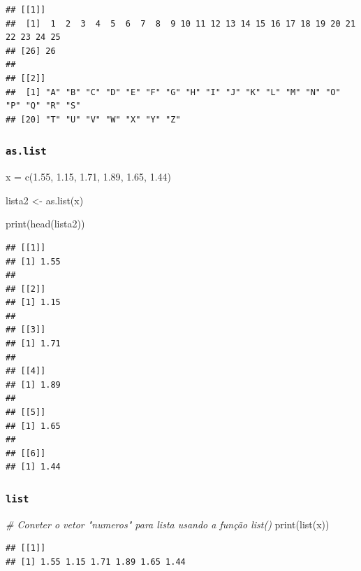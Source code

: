 \documentclass[
]{article}
\newenvironment{Shaded}{\begin{snugshade}}{\end{snugshade}}
\newcommand{\CommentTok}[1]{\textcolor[rgb]{0.56,0.35,0.01}{\textit{#1}}}
\newcommand{\FloatTok}[1]{\textcolor[rgb]{0.00,0.00,0.81}{#1}}
\newcommand{\FunctionTok}[1]{\textcolor[rgb]{0.00,0.00,0.00}{#1}}
\newcommand{\NormalTok}[1]{#1}
\newcommand{\OtherTok}[1]{\textcolor[rgb]{0.56,0.35,0.01}{#1}}
\begin{document}
\begin{verbatim}
## [[1]]
##  [1]  1  2  3  4  5  6  7  8  9 10 11 12 13 14 15 16 17 18 19 20 21 22 23 24 25
## [26] 26
## 
## [[2]]
##  [1] "A" "B" "C" "D" "E" "F" "G" "H" "I" "J" "K" "L" "M" "N" "O" "P" "Q" "R" "S"
## [20] "T" "U" "V" "W" "X" "Y" "Z"
\end{verbatim}

\hypertarget{as.list}{%
\subsubsection{\texorpdfstring{\texttt{as.list}}{as.list}}\label{as.list}}

\begin{Shaded}
\begin{Highlighting}[]
\NormalTok{x }\OtherTok{=} \FunctionTok{c}\NormalTok{(}\FloatTok{1.55}\NormalTok{, }\FloatTok{1.15}\NormalTok{, }\FloatTok{1.71}\NormalTok{, }\FloatTok{1.89}\NormalTok{, }\FloatTok{1.65}\NormalTok{, }\FloatTok{1.44}\NormalTok{)}

\NormalTok{lista2 }\OtherTok{\textless{}{-}} \FunctionTok{as.list}\NormalTok{(x)}

\FunctionTok{print}\NormalTok{(}\FunctionTok{head}\NormalTok{(lista2))}
\end{Highlighting}
\end{Shaded}

\begin{verbatim}
## [[1]]
## [1] 1.55
## 
## [[2]]
## [1] 1.15
## 
## [[3]]
## [1] 1.71
## 
## [[4]]
## [1] 1.89
## 
## [[5]]
## [1] 1.65
## 
## [[6]]
## [1] 1.44
\end{verbatim}

\hypertarget{list}{%
\subsubsection{\texorpdfstring{\texttt{list}}{list}}\label{list}}

\begin{Shaded}
\begin{Highlighting}[]
\CommentTok{\# Convter o vetor "numeros" para lista usando a função list()}
\FunctionTok{print}\NormalTok{(}\FunctionTok{list}\NormalTok{(x))}
\end{Highlighting}
\end{Shaded}

\begin{verbatim}
## [[1]]
## [1] 1.55 1.15 1.71 1.89 1.65 1.44
\end{verbatim}
\end{document}
